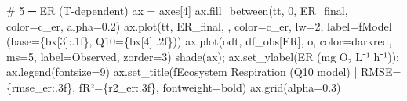 \documentclass[
  letterpaper,
  DIV=11,
  numbers=noendperiod]{scrartcl}
\newenvironment{Shaded}{\begin{snugshade}}{\end{snugshade}}
\newcommand{\CommentTok}[1]{\textcolor[rgb]{0.37,0.37,0.37}{#1}}
\newcommand{\DecValTok}[1]{\textcolor[rgb]{0.68,0.00,0.00}{#1}}
\newcommand{\FloatTok}[1]{\textcolor[rgb]{0.68,0.00,0.00}{#1}}
\newcommand{\NormalTok}[1]{\textcolor[rgb]{0.00,0.23,0.31}{#1}}
\newcommand{\OperatorTok}[1]{\textcolor[rgb]{0.37,0.37,0.37}{#1}}
\newcommand{\SpecialCharTok}[1]{\textcolor[rgb]{0.37,0.37,0.37}{#1}}
\newcommand{\SpecialStringTok}[1]{\textcolor[rgb]{0.13,0.47,0.30}{#1}}
\newcommand{\StringTok}[1]{\textcolor[rgb]{0.13,0.47,0.30}{#1}}
\begin{document}
\begin{Shaded}
\begin{Highlighting}[]
\CommentTok{\# 5 ─ ER (T{-}dependent)}
\NormalTok{ax }\OperatorTok{=}\NormalTok{ axes[}\DecValTok{4}\NormalTok{]}
\NormalTok{ax.fill\_between(tt, }\DecValTok{0}\NormalTok{, ER\_final, color}\OperatorTok{=}\NormalTok{c\_er, alpha}\OperatorTok{=}\FloatTok{0.2}\NormalTok{)}
\NormalTok{ax.plot(tt, ER\_final, }\StringTok{\textquotesingle{}{-}\textquotesingle{}}\NormalTok{, color}\OperatorTok{=}\NormalTok{c\_er, lw}\OperatorTok{=}\DecValTok{2}\NormalTok{,}
\NormalTok{        label}\OperatorTok{=}\SpecialStringTok{f\textquotesingle{}Model (base=}\SpecialCharTok{\{}\NormalTok{bx[}\DecValTok{3}\NormalTok{]}\SpecialCharTok{:.1f\}}\SpecialStringTok{, Q10=}\SpecialCharTok{\{}\NormalTok{bx[}\DecValTok{4}\NormalTok{]}\SpecialCharTok{:.2f\}}\SpecialStringTok{)\textquotesingle{}}\NormalTok{)}
\NormalTok{ax.plot(odt, df\_obs[}\StringTok{\textquotesingle{}ER\textquotesingle{}}\NormalTok{], }\StringTok{\textquotesingle{}o\textquotesingle{}}\NormalTok{, color}\OperatorTok{=}\StringTok{\textquotesingle{}darkred\textquotesingle{}}\NormalTok{, ms}\OperatorTok{=}\DecValTok{5}\NormalTok{,}
\NormalTok{        label}\OperatorTok{=}\StringTok{\textquotesingle{}Observed\textquotesingle{}}\NormalTok{, zorder}\OperatorTok{=}\DecValTok{3}\NormalTok{)}
\NormalTok{shade(ax)}\OperatorTok{;}\NormalTok{ ax.set\_ylabel(}\StringTok{\textquotesingle{}ER (mg O₂ L⁻¹ h⁻¹)\textquotesingle{}}\NormalTok{)}\OperatorTok{;}\NormalTok{ ax.legend(fontsize}\OperatorTok{=}\DecValTok{9}\NormalTok{)}
\NormalTok{ax.set\_title(}\SpecialStringTok{f\textquotesingle{}Ecosystem Respiration (Q10 model) | RMSE=}\SpecialCharTok{\{}\NormalTok{rmse\_er}\SpecialCharTok{:.3f\}}\SpecialStringTok{, \textquotesingle{}}
             \SpecialStringTok{f\textquotesingle{}R²=}\SpecialCharTok{\{}\NormalTok{r2\_er}\SpecialCharTok{:.3f\}}\SpecialStringTok{\textquotesingle{}}\NormalTok{, fontweight}\OperatorTok{=}\StringTok{\textquotesingle{}bold\textquotesingle{}}\NormalTok{)}
\NormalTok{ax.grid(alpha}\OperatorTok{=}\FloatTok{0.3}\NormalTok{)}


\end{Highlighting}
\end{Shaded}
\end{document}
